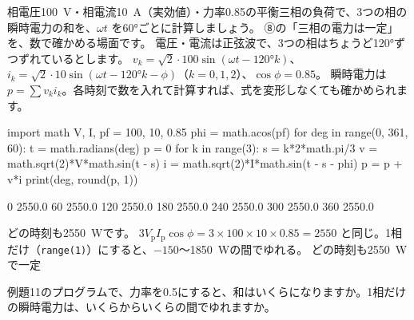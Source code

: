 \label{ph:電-11:ex11}
\begin{phreidai}
相電圧\qty{100}{V}・相電流\qty{10}{A}（実効値）・力率0.85の平衡三相の負荷で、3つの相の瞬時電力の和を、$\omega t$ を60°ごとに計算しましょう。
\phbamen
⑧の「三相の電力は一定」を、数で確かめる場面です。
\phmushi
電圧・電流は正弦波で、3つの相はちょうど120°ずつずれているとします。
\phzu
$v_k=\sqrt2\cdot100\sin(\omega t-120°k)$、$i_k=\sqrt2\cdot10\sin(\omega t-120°k-\phi)$（$k=0,1,2$）、$\cos\phi=0.85$。
\phriyu
瞬時電力は $p=\sum v_ki_k$。各時刻で数を入れて計算すれば、式を変形しなくても確かめられます。
\phtateru
\begin{phcode}[Python]
import math
V, I, pf = 100, 10, 0.85
phi = math.acos(pf)
for deg in range(0, 361, 60):
    t = math.radians(deg)
    p = 0
    for k in range(3):
        s = k*2*math.pi/3
        v = math.sqrt(2)*V*math.sin(t - s)
        i = math.sqrt(2)*I*math.sin(t - s - phi)
        p = p + v*i
    print(deg, round(p, 1))
\end{phcode}
\phtoku
\begin{phcodeout}
0 2550.0
60 2550.0
120 2550.0
180 2550.0
240 2550.0
300 2550.0
360 2550.0
\end{phcodeout}
どの時刻も\qty{2550}{W}です。
\phtashikame
$3V_{\mathrm p}I_{\mathrm p}\cos\phi=3\times100\times10\times0.85=2550$ と同じ。1相だけ（\texttt{range(1)}）にすると、$-150$〜\qty{1850}{W}の間でゆれる。
\kotae どの時刻も\qty{2550}{W}で一定
\end{phreidai}
\begin{jibun}
例題11のプログラムで、力率を0.5にすると、和はいくらになりますか。1相だけの瞬時電力は、いくらからいくらの間でゆれますか。
\end{jibun}

